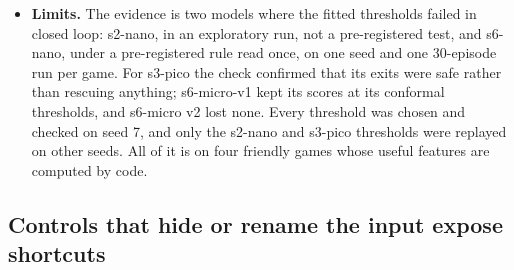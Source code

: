 \documentclass[10pt]{article}
\begin{document}
\begin{itemize}
\item \textbf{Limits.} The evidence is two models where the fitted thresholds failed in closed loop: s2-nano, in an exploratory run, not a pre-registered test, and s6-nano, under a pre-registered rule read once, on one seed and one 30-episode run per game. For s3-pico the check confirmed that its exits were safe rather than rescuing anything; s6-micro-v1 kept its scores at its conformal thresholds, and s6-micro v2 lost none. Every threshold was chosen and checked on seed 7, and only the s2-nano and s3-pico thresholds were replayed on other seeds. All of it is on four friendly games whose useful features are computed by code.
\end{itemize}

\subsection{Controls that hide or rename the input expose shortcuts}\label{sec:5.3}
\end{document}
